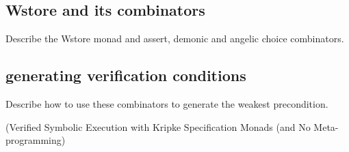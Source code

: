 \subsection{Wstore and its combinators}
Describe the Wstore monad and assert, demonic and angelic choice combinators.
\subsection{generating verification conditions}
Describe how to use these combinators to generate the weakest precondition.



(Verified Symbolic Execution with Kripke Specification
Monads (and No Meta-programming)


